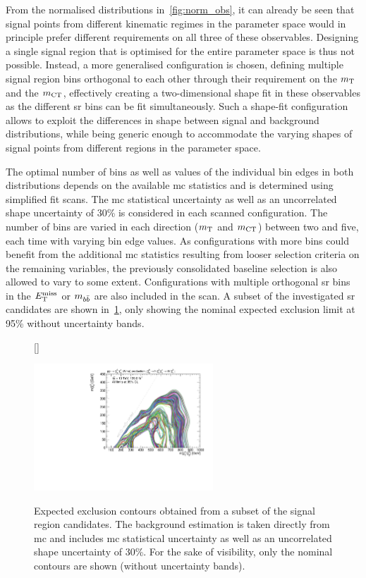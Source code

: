 From the normalised distributions in~\cref{fig:norm_obs}, it can already be seen that signal points from different kinematic regimes in the parameter space would in principle prefer different requirements on all three of these observables. Designing a single signal region that is optimised for the entire parameter space is thus not possible. Instead, a more generalised configuration is chosen, defining multiple signal region bins orthogonal to each other through their requirement on the $m_{\textrm{T}}$ and the $m_{\textrm{CT}}$, effectively creating a two-dimensional shape fit in these observables as the different \gls{sr} bins can be fit simultaneously. Such a shape-fit configuration allows to exploit the differences in shape between signal and background distributions, while being generic enough to accommodate the varying shapes of signal points from different regions in the parameter space.

The optimal number of bins as well as values of the individual bin edges in both distributions depends on the available \gls{mc} statistics and is determined using simplified fit scans. The \gls{mc} statistical uncertainty as well as an uncorrelated shape uncertainty of 30\% is considered in each scanned configuration. The number of bins are varied in each direction ($m_{\textrm{T}}$ and $m_{\textrm{CT}}$) between two and five, each time with varying bin edge values. As configurations with more bins could benefit from the additional \gls{mc} statistics resulting from looser selection criteria on the remaining variables, the previously consolidated baseline selection is also allowed to vary to some extent. Configurations with multiple orthogonal \gls{sr} bins in the $E_{\textrm{T}}^{\textrm{miss}}$ or $m_{b\bar{b}}$ are also included in the scan. A subset of the investigated \gls{sr} candidates are shown in~\cref{fig:fit_scan_optimisation}, only showing the nominal expected exclusion limit at 95\% without uncertainty bands.

\begin{figure}
[\FBwidth]
{\caption{Expected exclusion contours obtained from a subset of the signal region candidates. The background estimation is taken directly from \gls{mc} and includes \gls{mc} statistical uncertainty as well as an uncorrelated shape uncertainty of 30\%. For the sake of visibility, only the nominal contours are shown (without uncertainty bands).}\label{fig:fit_scan_optimisation}}
{\includegraphics[width=0.6\textwidth]{HF/batch_compare}}
\end{figure}

